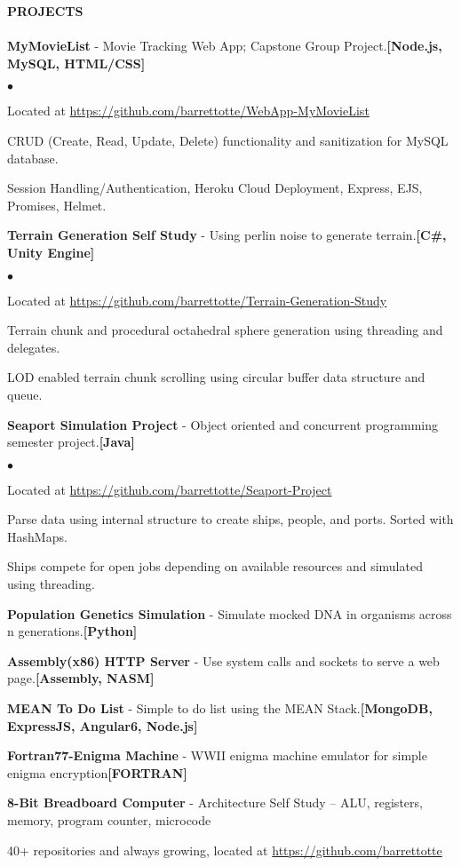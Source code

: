 \documentclass{article}
\newcommand{\lineunder}{
	\vspace*{-4pt}\\ 
	\hspace*{-18pt}\hrulefill \\
}
\newcommand{\header}[1]{
	{\hspace*{-15pt}\vspace*{6pt}\textsc{#1}}\vspace*{-6pt}\lineunder
}
\newcommand{\project}[3]{
	{\textbf{#1} - #2{\hfill\textbf{#3}}\vspace*{3pt}}
}
\newenvironment{resumeContent}{
	\begin{list}
		{\small$\bullet$}{\topsep 0pt \itemsep -2pt}}{\vspace*{4pt}
	\end{list}
}
\newcommand{\resumeheader}[1]{
	\vspace*{5pt}
	\header{\textbf{#1}}
}
\begin{document}
	\resumeheader{PROJECTS}
		\project
			{MyMovieList}
			{Movie Tracking Web App; Capstone Group Project.}
			{[Node.js, MySQL, HTML/CSS]}
			\begin{resumeContent}
				\item Located at \href{https://github.com/barrettotte/WebApp-MyMovieList}
					{https://github.com/barrettotte/WebApp-MyMovieList}
				\item CRUD (Create, Read, Update, Delete) functionality and sanitization for MySQL database.
				\item Session Handling/Authentication, Heroku Cloud Deployment, Express, EJS, Promises, Helmet.
			\end{resumeContent}
		\project
			{Terrain Generation Self Study}
			{Using perlin noise to generate terrain.}
			{[C\#, Unity Engine]}
			\begin{resumeContent}
				\item Located at \href{https://github.com/barrettotte/Terrain-Generation-Study}
					{https://github.com/barrettotte/Terrain-Generation-Study}
				\item Terrain chunk and procedural octahedral sphere generation using threading and delegates.
				\item LOD enabled terrain chunk scrolling using circular buffer data structure and queue. 
			\end{resumeContent}
		\project
			{Seaport Simulation Project}
			{Object oriented and concurrent programming semester project.} 
			{[Java]}
			\begin{resumeContent}
				\item Located at \href{https://github.com/barrettotte/Seaport-Project}
					{https://github.com/barrettotte/Seaport-Project}
				\item Parse data using internal structure to create ships, people, and ports. Sorted with HashMaps.
				\item Ships compete for open jobs depending on available resources and simulated using threading.
			\end{resumeContent}
		\project
			{Population Genetics Simulation}
			{Simulate mocked DNA in organisms across n generations.}
			{[Python]}
		\project
			{Assembly(x86) HTTP Server}
			{Use system calls and sockets to serve a web page.}
			{[Assembly, NASM]}
		\project
			{MEAN To Do List}
			{Simple to do list using the MEAN Stack.}
			{[MongoDB, ExpressJS, Angular6, Node.js]}
		\project
			{Fortran77-Enigma Machine}
			{WWII enigma machine emulator for simple enigma encryption}
			{[FORTRAN]}
		\project
			{8-Bit Breadboard Computer}
			{Architecture Self Study – ALU, registers, memory, program counter, microcode}
			{}
		\begin{center}
			\vspace*{-3pt}40+ repositories and always growing, located at 
			\href{https://github.com/barrettotte}{https://github.com/barrettotte}
		\end{center}
\end{document}
